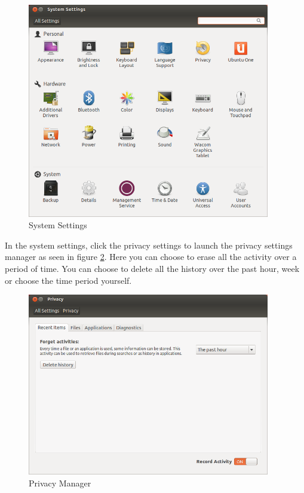 \begin{figure}[h!]	
	\centering
	\includegraphics[width=300pt]{./images/customize-ubuntu/gcc.png}
	\caption{System Settings}	
	\label{fig:gcc}		
\end{figure}

\par \noindent In the system settings, click the privacy settings to launch the privacy settings manager as seen in figure \ref{fig:privacy}. Here you can choose to erase all the activity over a period of time. You can choose to delete all the history over the past hour, week or choose the time period yourself. \\

\begin{figure}[h!]	
	\centering
	\includegraphics[width=300pt]{./images/customize-ubuntu/privacy.png}
	\caption{Privacy Manager}	
	\label{fig:privacy}		
\end{figure}

